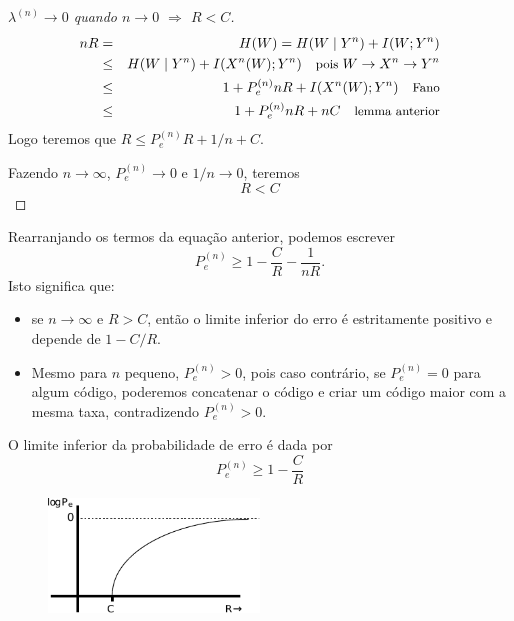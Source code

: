 \begin{frame}[allowframebreaks]
\begin{proof}[$\lambda^{(n)} \rightarrow 0$ quando $n \rightarrow 0$ $\Rightarrow$ $R < C$]
  \proofbreak

  \begin{eqnarray}
  nR &=& H(W) = H(W \mid Y^n) + I(W; Y^n) \\
	&\leq& H(W \mid Y^n) + I(X^n(W);Y^n) \quad \text{\small pois } W \rightarrow X^n \rightarrow Y^n \nonumber \\
	&\leq& 1 + P_e^{(n)} nR + I(X^n(W);Y^n)	\quad \text{\small Fano} \nonumber \\
	&\leq& 1 + P_e^{(n)} nR + nC \quad \text{\small lemma anterior} 
  \end{eqnarray}
  Logo teremos que $R \leq P_e^{(n)} R + 1/n +C$.

  Fazendo $n \rightarrow \infty$, $P_e^{(n)} \rightarrow 0$ e $1/n \rightarrow 0$, teremos 
	\begin{equation}
	R < C
	\end{equation}
  \end{proof}

  \framebreak
  
  Rearranjando os termos da equação anterior, podemos escrever
  \begin{equation}
   P_e^{(n)} \geq 1 - \frac{C}{R} - \frac{1}{nR} .
  \end{equation}
  Isto significa que:
  \begin{itemize}
  \item se $n \rightarrow \infty$ e $R>C$, então o limite inferior do erro é estritamente positivo e depende de $1 - C/R$.
  \item Mesmo para $n$ pequeno, $P_e^{(n)} > 0$, pois caso contrário, se $P_e^{(n)} = 0$ para algum código,
	poderemos concatenar o código e criar um código maior com a mesma taxa, contradizendo $P_e^{(n)} > 0$.
  \end{itemize}

  \framebreak

  O limite inferior da probabilidade de erro é dada por
  \begin{equation}
  P_e^{(n)} \geq 1 - \frac{C}{R}
  \end{equation}

                \begin{figure}[h!]
                \centering
                \includegraphics[width=0.5\textwidth]{images/logPe-vs-R.pdf}
                \label{fig:logPe-vs-R}
                \end{figure}


\end{frame}
